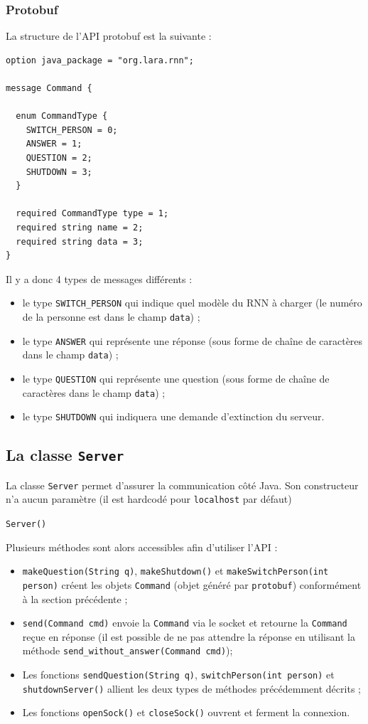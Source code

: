 \documentclass[10pt,a4paper]{article}
\begin{document}
\subsubsection{Protobuf}
La structure de l'API protobuf est la suivante :
\begin{verbatim}
option java_package = "org.lara.rnn";

message Command {

  enum CommandType {
    SWITCH_PERSON = 0;
    ANSWER = 1;
    QUESTION = 2;
    SHUTDOWN = 3;
  }

  required CommandType type = 1;
  required string name = 2;
  required string data = 3;
}
\end{verbatim}
Il y a donc 4 types de messages différents :
\begin{itemize}
	\item le type \texttt{SWITCH\_PERSON} qui indique quel modèle du RNN à charger (le numéro de la personne est dans le champ \texttt{data}) ;
	\item le type \texttt{ANSWER} qui représente une réponse (sous forme de chaîne de caractères dans le champ \texttt{data}) ;
	\item le type \texttt{QUESTION} qui représente une question (sous forme de chaîne de caractères dans le champ \texttt{data}) ;
	\item le type \texttt{SHUTDOWN} qui indiquera une demande d'extinction du serveur.
\end{itemize}
\subsection{La classe \texttt{Server}}
La classe \texttt{Server} permet d'assurer la communication côté Java. Son constructeur n'a aucun paramètre (il est hardcodé pour \texttt{localhost} par défaut)
\begin{center}
	\texttt{Server()}
\end{center}
Plusieurs méthodes sont alors accessibles afin d'utiliser l'API :
\begin{itemize}
	\item \texttt{makeQuestion(String q)}, \texttt{makeShutdown()} et \texttt{makeSwitchPerson(int person)} créent les objets \texttt{Command} (objet généré par \texttt{protobuf}) conformément à la section précédente ;
	\item \texttt{send(Command cmd)} envoie la \texttt{Command} via le socket et retourne la \texttt{Command} reçue en réponse (il est possible de ne pas attendre la réponse en utilisant la méthode \texttt{send\_without\_answer(Command cmd)});
	\item Les fonctions \texttt{sendQuestion(String q)}, \texttt{switchPerson(int person)} et \texttt{shutdownServer()} allient les deux types de méthodes précédemment décrits ;
	\item Les fonctions \texttt{openSock()} et \texttt{closeSock()} ouvrent et ferment la connexion.
\end{itemize}
\end{document}
